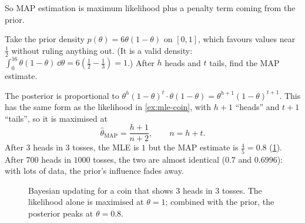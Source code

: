 So MAP estimation is maximum likelihood plus a penalty term coming from the prior.

\begin{example}\label{ex:map-coin}
Take the prior density $p(\theta) = 6\theta(1 - \theta)$ on $[0, 1]$, which
favours values near $\frac12$ without ruling anything out. (It is a valid
density: $\int_0^16\theta(1 - \theta)\,\dd\theta = 6\left(\frac12 -
\frac13\right) = 1$.) After $h$ heads and $t$ tails, find the MAP estimate.

\sol The posterior is proportional to
$\theta^h(1 - \theta)^t\cdot\theta(1 - \theta) = \theta^{h+1}(1 - \theta)^{t+1}$.
This has the same form as the likelihood in \cref{ex:mle-coin}, with $h + 1$
``heads'' and $t + 1$ ``tails'', so it is maximised at
\[
  \hat\theta_{\mathrm{MAP}} = \frac{h + 1}{n + 2}, \qquad n = h + t .
\]
After $3$ heads in $3$ tosses, the MLE is $1$ but the MAP estimate is
$\frac45 = 0.8$ (\cref{fig:prior-posterior}). After $700$ heads in $1000$ tosses,
the two are almost identical ($0.7$ and $0.6996$): with lots of data, the prior's
influence fades away.
\end{example}

\begin{figure}[htbp]
\centering
{}
\caption{Bayesian updating for a coin that shows $3$ heads in $3$ tosses. The
  likelihood alone is maximised at $\theta = 1$; combined with the prior, the
  posterior peaks at $\theta = 0.8$.}
\label{fig:prior-posterior}
\end{figure}

